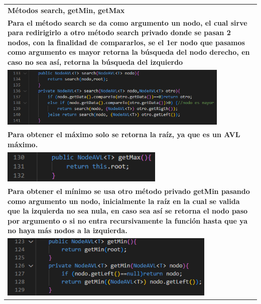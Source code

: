 \documentclass[9pt]{article}
\begin{document}
\begin{longtable}{|p{15cm}|}
		\textbf{Métodos search, getMin, getMax}\\
		\textbf{Para el método search se da como argumento un nodo,
		 el cual sirve para redirigirlo a otro método search privado 
		 donde se pasan 2 nodos, con la finalidad de compararlos, 
		 se el 1er nodo que pasamos como argumento es mayor retorna
		  la búsqueda del nodo derecho, en caso no sea así, retorna
		   la búsqueda del izquierdo}\\
		\includegraphics[width=0.85\textwidth,keepaspectratio]{img/search.png}\\
		\textbf{Para obtener el máximo solo se retorna la raíz, ya que es un AVL máximo.		}\\
		\includegraphics[width=0.6\textwidth,keepaspectratio]{img/getMax.png}\\
		\textbf{Para obtener el mínimo se usa otro método privado getMin 
		pasando como argumento un nodo, inicialmente la raíz en la cual 
		se valida que la izquierda no sea nula, en caso sea así se retorna 
		el nodo paso por argumento o si no entra recursivamente  la función 
		hasta que ya no haya más nodos a la izquierda.}  \\
		\includegraphics[width=0.8\textwidth,keepaspectratio]{img/getMin.png}\\
		

\end{longtable}
\end{document}
